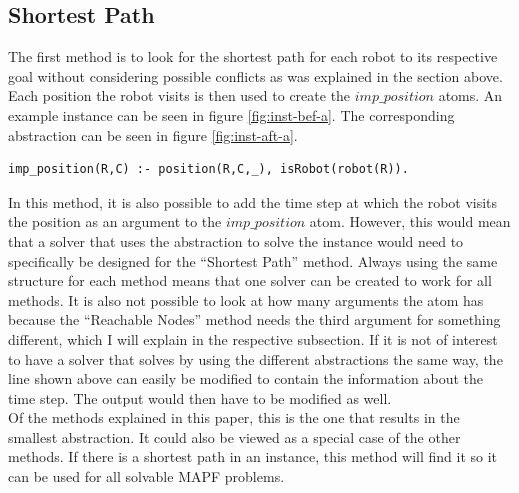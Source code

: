 \documentclass[runningheads]{llncs}
\begin{document}
\subsection{Shortest Path}
The first method is to look for the shortest path for each robot to its respective goal without considering possible conflicts as was explained in the section above. Each position the robot visits is then used to create the $imp\_position$ atoms. An example instance can be seen in figure \ref{fig:inst-bef-a}. The corresponding abstraction can be seen in figure \ref{fig:inst-aft-a}.
\begin{verbatim}
imp_position(R,C) :- position(R,C,_), isRobot(robot(R)).
\end{verbatim}
In this method, it is also possible to add the time step at which the robot visits the position as an argument to the $imp\_position$ atom. However, this would mean that a solver that uses the abstraction to solve the instance would need to specifically
be designed for the ``Shortest Path'' method. Always using the same structure for each method means that one solver can be created to work for all methods. It is also not possible to look at how many arguments the atom has because the 
``Reachable Nodes'' method needs the third argument for something different, which I will explain in the respective subsection. If it is not of interest to have a solver that solves by using the different abstractions the same way, the line shown above can 
easily be modified to contain the information about the time step. The output would then have to be modified as well. \\
Of the methods explained in this paper, this is the one that results in the smallest abstraction. It could also be viewed as a special case of the other methods. If there is a shortest path in an instance, this method will find it so it can be used for all solvable
MAPF problems. 
\end{document}
